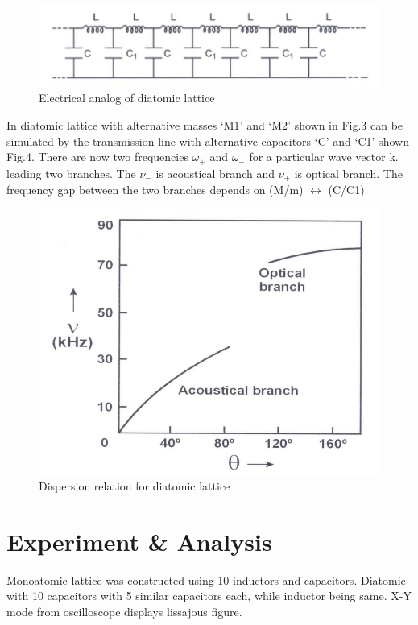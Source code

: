 \documentclass[a4paper, amsfonts, amssymb, amsmath, reprint, showkeys, nofootinbib, twoside]{revtex4-1}
\begin{document}
\begin{figure}[H]
	\centering
	\includegraphics[scale=0.3]{4} 
	\caption{Electrical analog of diatomic lattice}
	\label{s}
\end{figure}

In diatomic lattice with alternative masses ‘M1’ and ‘M2’ shown in Fig.3 can be
simulated by the transmission line with alternative capacitors ‘C’ and ‘C1’ shown Fig.4. There are now two frequencies $\omega_+$ and $\omega_-$ for a particular wave vector k. leading two branches. The $\nu_-$ is acoustical branch and $\nu_+$ is optical branch. The frequency gap between the two branches depends on (M/m) $\leftrightarrow$ (C/C1)

\begin{figure}[H]
	\centering
	\includegraphics[scale=0.3]{5} 
	\caption{Dispersion relation for diatomic lattice}
	\label{s}
\end{figure}

\section{Experiment \& Analysis}
Monoatomic lattice was constructed using 10 inductors and capacitors. Diatomic with 10 capacitors with 5 similar capacitors each, while inductor being same. X-Y mode from oscilloscope displays lissajous figure.
\end{document}
